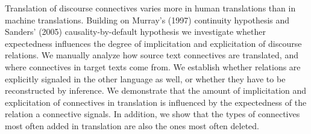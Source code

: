 Translation of discourse connectives varies more in human translations than in machine translations. Building on Murray's (1997) continuity hypothesis and Sanders' (2005) causality-by-default hypothesis we investigate whether expectedness influences the degree of implicitation and explicitation of discourse relations. We manually analyze how source text connectives are translated, and where connectives in target texts come from. We establish whether relations are explicitly signaled in the other language as well, or whether they have to be reconstructed by inference. We demonstrate that the amount of implicitation and explicitation of connectives in translation is influenced by the expectedness of the relation a connective signals. In addition, we show that the types of connectives most often added in translation are also the ones most often deleted.
